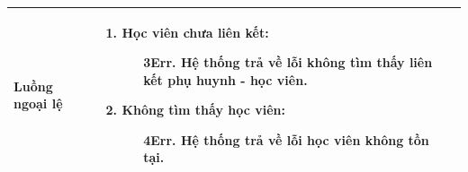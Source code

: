 {\begin{tabularx}{\textwidth}{|>{\raggedright\arraybackslash}p{3.5cm}|>{\raggedright\arraybackslash}X|}
\hline
\textbf{Luồng ngoại lệ} &
\begin{enumerate}
    \item \textbf{Học viên chưa liên kết:}
    \begin{enumerate}
        \item[3Err.] Hệ thống trả về lỗi không tìm thấy liên kết phụ huynh - học viên.
    \end{enumerate}
    \item \textbf{Không tìm thấy học viên:}
    \begin{enumerate}
        \item[4Err.] Hệ thống trả về lỗi học viên không tồn tại.
    \end{enumerate}
\end{enumerate} \\
\hline
\end{tabularx}
}
